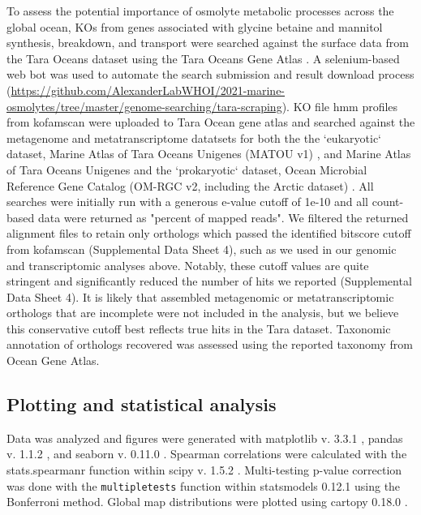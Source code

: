 \documentclass[utf8]{frontiersSCNS} %
\begin{document}
To assess the potential importance of osmolyte metabolic processes across the global ocean, KOs from genes associated with glycine betaine and mannitol synthesis, breakdown, and transport were searched against the surface data from the Tara Oceans dataset using the Tara Oceans Gene Atlas \citep{Villar_2018}. A selenium-based web bot was used to automate the search submission and result download process (\url{https://github.com/AlexanderLabWHOI/2021-marine-osmolytes/tree/master/genome-searching/tara-scraping}). KO file hmm profiles from kofamscan were uploaded to Tara Ocean gene atlas and searched against the metagenome and metatranscriptome datatsets for both the the `eukaryotic` dataset, Marine Atlas of Tara Oceans Unigenes (MATOU v1) \citep{Carradec2018}, and Marine Atlas of Tara Oceans Unigenes and the `prokaryotic` dataset, Ocean Microbial Reference Gene Catalog (OM-RGC v2, including the Arctic dataset) \citep{Salazar_2019}. All searches were initially run with a generous e-value cutoff of 1e-10 and all count-based data were returned as "percent of mapped reads". We filtered the returned alignment files to retain only orthologs which passed the identified bitscore cutoff from kofamscan (Supplemental Data Sheet 4), such as we used in our genomic and transcriptomic analyses above. Notably, these cutoff values are quite stringent and significantly reduced the number of hits we reported (Supplemental Data Sheet 4). It is likely that assembled metagenomic or metatranscriptomic orthologs that are incomplete were not included in the analysis, but we believe this conservative cutoff best reflects true hits in the Tara dataset. Taxonomic annotation of orthologs recovered was assessed using the reported taxonomy from Ocean Gene Atlas. 

\subsection{Plotting and statistical analysis}

Data was analyzed and figures were generated with matplotlib v. 3.3.1 \citep{Hunter:2007}, pandas v. 1.1.2 \citep{reback2020pandas}, and seaborn v. 0.11.0 \citep{waskom2020seaborn}. Spearman correlations were calculated with the stats.spearmanr function within scipy v. 1.5.2 \citep{2020SciPy-NMeth}. Multi-testing p-value correction was done with the \texttt{multipletests} function within statsmodels 0.12.1 using the Bonferroni method. Global map distributions were plotted using cartopy 0.18.0 \citep{Cartopy}.
\end{document}

